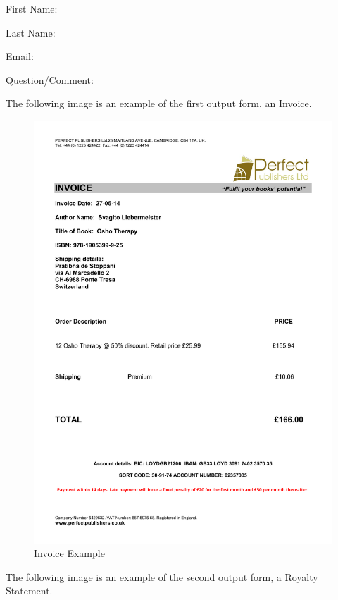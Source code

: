 First Name:

Last Name:

Email:

Question/Comment:



The following image is an example of the first output form, an Invoice.

\begin{figure}[H]
    \includegraphics[width=\textwidth]{./Analysis/Invoice_Example.pdf}
    \caption{Invoice Example} \label{Invoice_Example.pdf}
\end{figure}


The following image is an example of the second output form, a Royalty Statement.

